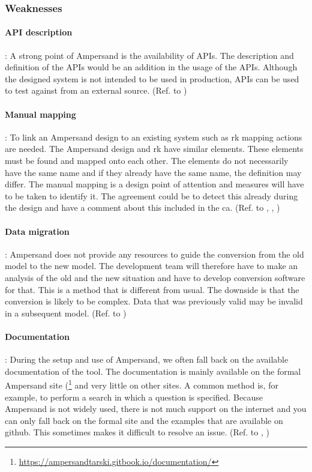 \subsubsection{Weaknesses}\label{subsub:4_weaknesses}

\paragraph{\textbf{API description}}\label{swot:w_api_its_description}:
A strong point of Ampersand is the availability of APIs.
The description and definition of the APIs would be an addition in the usage of the APIs.
Although the designed system is not intended to be used in production, APIs can be used to test against from an external source.
(Ref. to )

\paragraph{\textbf{Manual mapping}}\label{swot:w_manual_mapping}:
To link an Ampersand design to an existing system such as \acrshort{rk} mapping actions are needed.
The Ampersand design and \acrshort{rk} have similar elements.
These elements must be found and mapped onto each other.
The elements do not necessarily have the same name and if they already have the same name, the definition may differ.
The manual mapping is a design point of attention and measures will have to be taken to identify it.
The agreement could be to detect this already during the design and have a comment about this included in the \acrshort{ca}.
(Ref. to , , )

\paragraph{\textbf{Data migration}}\label{swot:w_data_migration}:
Ampersand does not provide any resources to guide the conversion from the old model to the new model.
The development team will therefore have to make an analysis of the old and the new situation and have to develop conversion software for that.
This is a method that is different from usual.
The downside is that the conversion is likely to be complex.
Data that was previously valid may be invalid in a subsequent model.
(Ref. to )

\paragraph{\textbf{Documentation }}\label{swot:w_documentation}:
During the setup and use of Ampersand, we often fall back on the available documentation of the tool.
The documentation is mainly available on the formal Ampersand site (\footnote{\url{https://ampersandtarski.gitbook.io/documentation/}} and very little on other sites.
A common method is, for example, to perform a search in which a question is specified.
Because Ampersand is not widely used, there is not much support on the internet and you can only fall back on the formal site and the examples that are available on github.
This sometimes makes it difficult to resolve an issue.
(Ref. to , )

